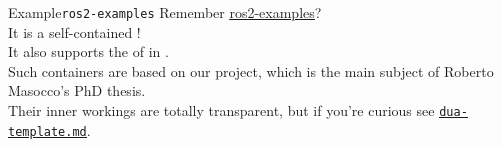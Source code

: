 \begin{frame}{Example}{\texttt{ros2-examples}}
  Remember \href{https://github.com/IntelligentSystemsLabUTV/ros2-examples}{\color{blue}\underline{ros2-examples}}?\\
  It is a self-contained !\\
  \bigskip
  It also supports the  of  in .\\
	Such containers are based on our \href{https://github.com/dotX-Automation/dua-template}{} project, which is the main subject of Roberto Masocco's PhD thesis.\\
  \bigskip
	Their inner workings are totally transparent, but if you're curious see \href{https://github.com/IntelligentSystemsLabUTV/ros2-examples/blob/jazzy/dua-template.md}{\color{blue}\underline{\texttt{dua-template.md}}}.
\end{frame}
